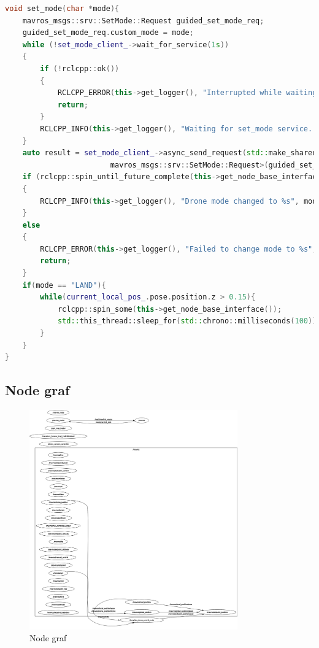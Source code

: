 \begin{lstlisting}[language=C++, caption={Funkcia pre nastavenie režimu dronu}]
void set_mode(char *mode){
    mavros_msgs::srv::SetMode::Request guided_set_mode_req;
    guided_set_mode_req.custom_mode = mode;
    while (!set_mode_client_->wait_for_service(1s))
    {
        if (!rclcpp::ok())
        {
            RCLCPP_ERROR(this->get_logger(), "Interrupted while waiting for the set_mode service. Exiting.");
            return;
        }
        RCLCPP_INFO(this->get_logger(), "Waiting for set_mode service...");
    }
    auto result = set_mode_client_->async_send_request(std::make_shared<
                        mavros_msgs::srv::SetMode::Request>(guided_set_mode_req));
    if (rclcpp::spin_until_future_complete(this->get_node_base_interface(), result) == rclcpp::FutureReturnCode::SUCCESS)
    {
        RCLCPP_INFO(this->get_logger(), "Drone mode changed to %s", mode);
    }
    else
    {
        RCLCPP_ERROR(this->get_logger(), "Failed to change mode to %s", mode);
        return;
    }
    if(mode == "LAND"){
        while(current_local_pos_.pose.position.z > 0.15){
            rclcpp::spin_some(this->get_node_base_interface());
            std::this_thread::sleep_for(std::chrono::milliseconds(100));
        }
    }
}
\end{lstlisting}
\newpage
\subsection{Node graf}
\begin{figure}[!htpb]
    \centering
    \includegraphics[width=0.8\textwidth]{img/rosgraph.png}
    \caption{Node graf}
    \label{fig:node_graph}
\end{figure}
